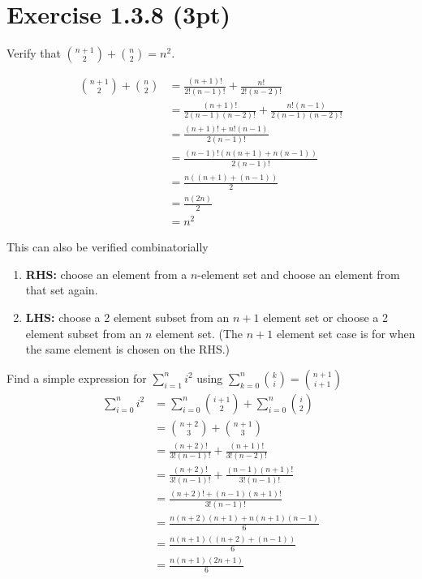 \documentclass{article}
\begin{document}
\section*{Exercise 1.3.8 (3pt)}
Verify that $\binom{n+1}{2} + \binom{n}{2} = n^2$.
\begin{multicols}{2}
	
\begin{align*}
	\binom{n+1}{2} + \binom{n}{2} &= \frac{(n+1)!}{2!(n-1)!} + \frac{n!}{2!(n-2)!} \\
				      &= \frac{(n+1)!}{2(n-1)(n-2)!} + \frac{n!(n-1)}{2(n-1)(n-2)!} \\
				      &= \frac{(n+1)! + n!(n-1)}{2(n-1)!} \\
				      &= \frac{(n-1)!(n(n+1) + n(n-1))}{2(n-1)!} \\
				      &= \frac{n((n+1) + (n-1))}{2} \\
				      &= \frac{n(2n)}{2} \\
				      &= n^2
\end{align*}

This can also be verified combinatorially
\begin{enumerate}
	\item[]\textbf{RHS:} choose an element from a $n$-element set and choose an element from that set again. 
	\item[]\textbf{LHS:} choose a 2 element subset from an $n+1$ element set or choose a 2 element subset from an $n$ element set. (The $n+1$ element set case is for when the same element is chosen on the RHS.)
\end{enumerate}
\end{multicols}
Find a simple expression for $\sum_{i=1}^{n} i^2$ using $ \sum_{k=0}^{n} \binom{k}{i} = \binom{n+1}{i+1} $
\begin{align*}
	\sum_{i=0}^{n} i^2 &= \sum_{i=0}^n \binom{i+1}{2} + \sum_{i=0}^n\binom{i}{2} \\
			   &= \binom{n+2}{3} + \binom{n+1}{3} \\
			   &= \frac{(n+2)!}{3!(n-1)!} + \frac{(n+1)!}{3!(n-2)!} \\
			   &= \frac{(n+2)!}{3!(n-1)!} + \frac{(n-1)(n+1)!}{3!(n-1)!} \\
			   &= \frac{(n+2)! + (n-1)(n+1)!}{3!(n-1)!} \\
			   &= \frac{n(n+2)(n+1) + n(n+1)(n-1)}{6} \\
			   &= \frac{n(n+1)((n+2) + (n-1))}{6} \\
			   &= \frac{n(n+1)(2n+1)}{6}
\end{align*}
\end{document}

